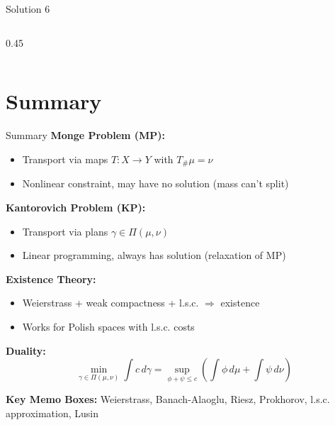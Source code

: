 \documentclass[aspectratio=169]{beamer}
\begin{document}
\begin{frame}{Solution 6}
\begin{columns}
\begin{column}{0.45\textwidth}
\begin{center}
\end{center}
\end{column}
\end{columns}
\end{frame}

\section{Summary}

\begin{frame}{Summary}
\textbf{Monge Problem (MP):}
\begin{itemize}
    \item Transport via maps $T: X \to Y$ with $T_\# \mu = \nu$
    \item Nonlinear constraint, may have no solution (mass can't split)
\end{itemize}

\vspace{0.2cm}
\textbf{Kantorovich Problem (KP):}
\begin{itemize}
    \item Transport via plans $\gamma \in \Pi(\mu, \nu)$
    \item Linear programming, always has solution (relaxation of MP)
\end{itemize}

\vspace{0.2cm}
\textbf{Existence Theory:}
\begin{itemize}
    \item Weierstrass + weak compactness + l.s.c. $\Rightarrow$ existence
    \item Works for Polish spaces with l.s.c. costs
\end{itemize}

\vspace{0.2cm}
\textbf{Duality:}
\[
\min_{\gamma \in \Pi(\mu,\nu)} \int c \, d\gamma = \sup_{\phi + \psi \leq c} \left( \int \phi \, d\mu + \int \psi \, d\nu \right)
\]

\vspace{0.2cm}
\textbf{Key Memo Boxes:} Weierstrass, Banach-Alaoglu, Riesz, Prokhorov, l.s.c. approximation, Lusin
\end{frame}
\end{document}
